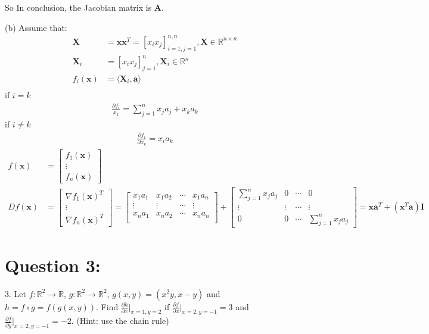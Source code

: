 \documentclass[a4paper,12pt]{article}
\newcommand{\R}{\mathbb{R}}
\begin{document}
\noindent
So In conclusion, the Jacobian matrix is \(\bm{A}\).

\vspace{1cm}
\noindent
(b) 
Assume that:
\begin{align*}
    \bm{X} &= \bm{x} \bm{x}^T= [x_i x_j]_{i = 1, j = 1}^{n, n}, \bm{X} \in \R^{n \times n} \\ 
    \bm{X}_i &= [x_ix_j]_{j=1}^n, \bm{X}_i \in \R^n\\
    f_i(\bm{x}) &= \langle \bm{X}_i, \bm{a} \rangle \\
\end{align*}
if \(i = k\)
\begin{align*}
   \frac{\partial f_i}{x_k} = \sum_{j=1}^n x_ja_j + x_ka_k
\end{align*}
if \(i \ne k\)
\begin{align*}
    \frac{\partial f_i}{\partial x_k}  = x_ia_k
\end{align*}
\begin{align*}
    f(\bm{x}) &= \begin{bmatrix}
        f_1(\bm{x}) \\
        \vdots \\
        f_n(\bm{x})
    \end{bmatrix} \\
    Df(\bm{x}) &= \begin{bmatrix}
        \nabla f_1(\bm{x})^T \\
        \vdots \\
        \nabla f_n(\bm{x})^T     
    \end{bmatrix} = 
    \begin{bmatrix}
        x_1a_1 & x_1a_2 & \cdots & x_1a_n \\
        \vdots & \vdots & \cdots & \vdots\\ 
        x_na_1 & x_na_2 & \cdots & x_na_n \\
    \end{bmatrix} + \begin{bmatrix}
        \sum_{j=1}^{n}x_ja_j & 0 & \cdots & 0 \\
        \vdots & \vdots & \cdots & \vdots\\ 
        0 & 0 & \cdots &\sum_{j=1}^{n}x_ja_j 
    \end{bmatrix} = \bm{x}\bm{a}^T + (\bm{x}^T\bm{a})\bm{I}
\end{align*}




\section*{Question 3:}
3. Let \(f : \R^2 \to \R\), \(g : \R^2 \to \R^2\), \(g(x, y) = (x^2y, x-y)\) and \(h = f \circ g = f(g(x, y))\). Find \(\frac {\partial h}{\partial x}|_{x=1, y=2}\) if
\(\frac{\partial f}{\partial x}|_{x=2, y=-1} = 3\) and \(\frac{\partial f}{\partial y}|_{x=2, y=-1} = -2\). (Hint: use the chain rule)
\end{document}
